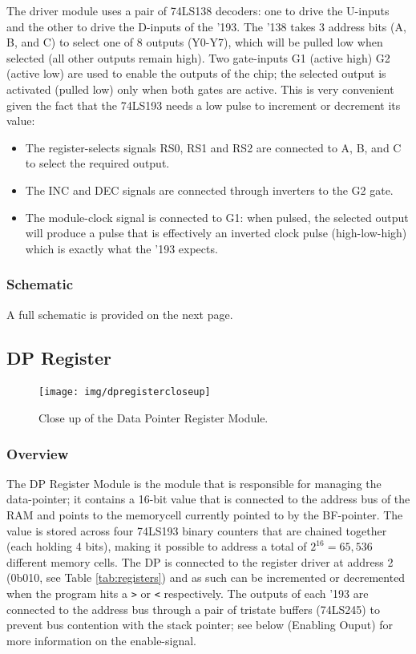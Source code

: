 The driver module uses a pair of 74LS138 decoders: one to drive the U-inputs and the other to drive the D-inputs of the '193. The '138 takes 3 address bits (A, B, and C) to select one of 8 outputs (Y0-Y7), which will be pulled low when selected (all other outputs remain high). Two gate-inputs G1 (active high) G2 (active low) are used to enable the outputs of the chip; the selected output is activated (pulled low) only when both gates are active. This is very convenient given the fact that the 74LS193 needs a low pulse to increment or decrement its value:
\begin{itemize}
\item The register-selects signals RS0, RS1 and RS2 are connected to A, B, and C to select the required output.
\item The INC and DEC signals are connected through inverters to the G2 gate.
\item The module-clock signal is connected to G1: when pulsed, the selected output will produce a pulse that is effectively an inverted clock pulse (high-low-high) which is exactly what the '193 expects. 
\end{itemize}

\subsubsection{Schematic}
A full schematic is provided on the next page.



\subsection{DP Register}
\begin{figure}[H]
  \centering
  \texttt{[image: img/dpregistercloseup]}
  \caption{Close up of the Data Pointer Register Module.}
  \label{fig:dpregcloseup}
\end{figure}

\subsubsection{Overview}
The DP Register Module is the module that is responsible for managing the data-pointer; it contains a 16-bit value that is connected to the address bus of the RAM and points to the memorycell currently pointed to by the BF-pointer. The value is stored across four 74LS193 binary counters that are chained together (each holding 4 bits), making it possible to address a total of $2^{16}=65,536$ different memory cells. The DP is connected to the register driver at address 2 (0b010, see Table \ref{tab:registers}) and as such can be incremented or decremented when the program hits a \texttt{>} or \texttt{<} respectively. The outputs of each '193 are connected to the address bus through a pair of tristate buffers (74LS245) to prevent bus contention with the stack pointer; see below (Enabling Ouput) for more information on the enable-signal.

